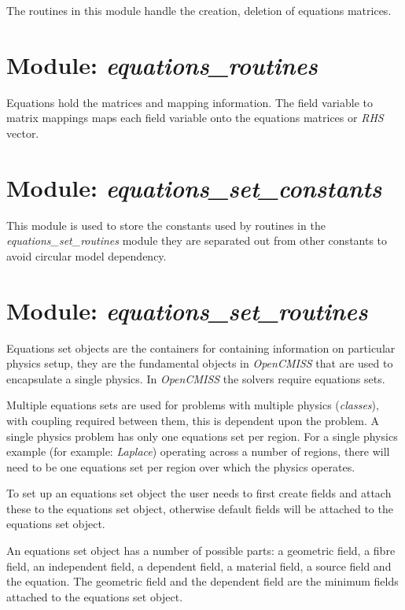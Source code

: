 The routines in this module handle the creation, deletion of equations 
matrices.


\section{Module: \emph{equations\_routines}}
\label{sec:equationsroutines}

Equations hold the matrices and mapping information. The field variable 
to matrix mappings maps each field variable onto the equations matrices or 
\emph{RHS} vector.


\section{Module: \emph{equations\_set\_constants}}
\label{sec:equationssetconstants}

This module is used to store the constants used by routines in the \\
\emph{equations\_set\_routines} module they are separated out from 
other constants to avoid circular model dependency.


\section{Module: \emph{equations\_set\_routines}}
\label{sec:equationssetroutines}

Equations set objects are the containers for containing information on 
particular physics setup, they are the fundamental objects in 
\emph{OpenCMISS} that are used to encapsulate a single physics. In 
\emph{OpenCMISS} the solvers require equations sets.

Multiple equations sets are used for problems with multiple physics 
(\emph{classes}), with coupling required between them, this is 
dependent upon the problem. A single physics problem has only one 
equations set per region. For a single physics example (for example: 
\emph{Laplace}) operating across a number of regions, there will need 
to be one equations set per region over which the physics operates.

To set up an equations set object the user needs to first create fields and
attach these to the equations set object, otherwise default fields will be 
attached to the equations set object.

An equations set object has a number of possible parts: a geometric field, 
a fibre field, an independent field, a dependent field, a material field, a 
source field and the equation. The geometric field and the dependent field 
are the minimum fields attached to the equations set object.

